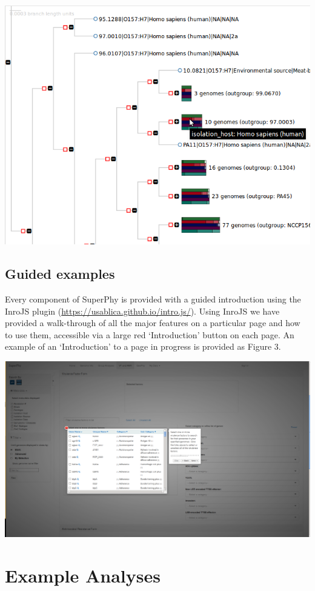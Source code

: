 \documentclass{bmcart}
\begin{document}
 \includegraphics[width=\textwidth]{images/superphy_tree_tooltip.png}

\subsection{Guided examples}
Every component of SuperPhy is provided with a guided introduction using the InroJS plugin (\url{https://usablica.github.io/intro.js/}). Using InroJS we have provided a walk-through of all the major features on a particular page and how to use them, accessible via a large red `Introduction' button on each page. An example of an `Introduction' to a page in progress is provided as Figure 3.

\includegraphics[width=\textwidth]{images/introjs_vfamr.png}

\section{Example Analyses}
\end{document}
